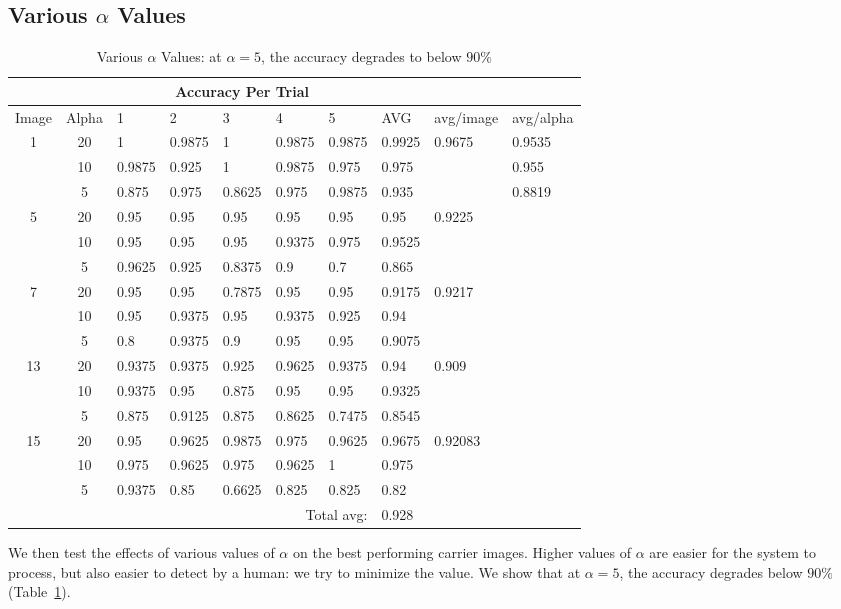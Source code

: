 \documentclass[11pt, letterpaper]{article}
\begin{document}
\subsection{Various $\alpha$ Values}
\begin{table}[t]
\caption{Various $\alpha$ Values: at $\alpha = 5$, the accuracy degrades to below $90 \% $}
\label{tab:alpha}
\centering
\begin{tabular}{c c | l l l l l l l l}
\\
&&\multicolumn{5}{c}{Accuracy Per Trial}&&&\\ 
\toprule
Image&Alpha&1&2&3&4&5&AVG&avg/image&avg/alpha\\ 
\midrule
1&20&1&0.9875&1&0.9875&0.9875&0.9925&0.9675&0.9535\\ 
&10&0.9875&0.925&1&0.9875&0.975&0.975&&0.955\\ 
&5&0.875&0.975&0.8625&0.975&0.9875&0.935&&0.8819\\ 
5&20&0.95&0.95&0.95&0.95&0.95&0.95&0.9225&\\ 
&10&0.95&0.95&0.95&0.9375&0.975&0.9525&&\\ 
&5&0.9625&0.925&0.8375&0.9&0.7&0.865&&\\ 
7&20&0.95&0.95&0.7875&0.95&0.95&0.9175&0.9217&\\ 
&10&0.95&0.9375&0.95&0.9375&0.925&0.94&&\\ 
&5&0.8&0.9375&0.9&0.95&0.95&0.9075&&\\ 
13&20&0.9375&0.9375&0.925&0.9625&0.9375&0.94&0.909&\\ 
&10&0.9375&0.95&0.875&0.95&0.95&0.9325&&\\ 
&5&0.875&0.9125&0.875&0.8625&0.7475&0.8545&&\\ 
15&20&0.95&0.9625&0.9875&0.975&0.9625&0.9675&0.92083&\\ 
&10&0.975&0.9625&0.975&0.9625&1&0.975&&\\ 
&5&0.9375&0.85&0.6625&0.825&0.825&0.82&&\\ 
\bottomrule 
&&&&&\multicolumn{2}{r}{Total avg:}&0.928&&\\ 
\end{tabular}
\end{table}

We then test the effects of various values of $\alpha$ on the best performing carrier images.
Higher values of $\alpha$ are easier for the system to process, but also easier to detect by a human: we try to minimize the value.
We show that at $\alpha = 5$, the accuracy degrades below $90 \% $ (Table~\ref{tab:alpha}).
\end{document}
